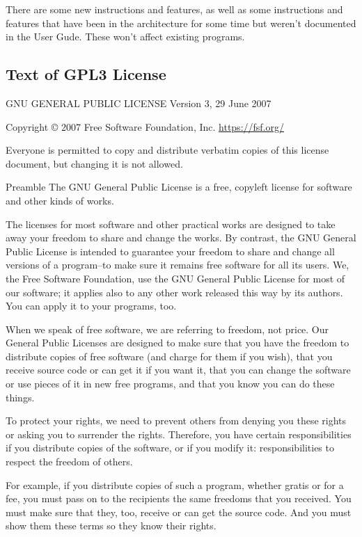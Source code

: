 \documentclass[11pt]{article}
\begin{document}
There are some new instructions and features, as well as some
instructions and features that have been in the architecture for some
time but weren't documented in the User Gude.  These won't affect
existing programs.


\subsection*{Text of GPL3 License}
\label{sec:org93c51e0}

GNU GENERAL PUBLIC LICENSE
Version 3, 29 June 2007

Copyright © 2007 Free Software Foundation, Inc. \url{https://fsf.org/}

Everyone is permitted to copy and distribute verbatim copies of this license document, but changing it is not allowed.

Preamble
The GNU General Public License is a free, copyleft license for software and other kinds of works.

The licenses for most software and other practical works are designed to take away your freedom to share and change the works. By contrast, the GNU General Public License is intended to guarantee your freedom to share and change all versions of a program--to make sure it remains free software for all its users. We, the Free Software Foundation, use the GNU General Public License for most of our software; it applies also to any other work released this way by its authors. You can apply it to your programs, too.

When we speak of free software, we are referring to freedom, not price. Our General Public Licenses are designed to make sure that you have the freedom to distribute copies of free software (and charge for them if you wish), that you receive source code or can get it if you want it, that you can change the software or use pieces of it in new free programs, and that you know you can do these things.

To protect your rights, we need to prevent others from denying you these rights or asking you to surrender the rights. Therefore, you have certain responsibilities if you distribute copies of the software, or if you modify it: responsibilities to respect the freedom of others.

For example, if you distribute copies of such a program, whether gratis or for a fee, you must pass on to the recipients the same freedoms that you received. You must make sure that they, too, receive or can get the source code. And you must show them these terms so they know their rights.
\end{document}
